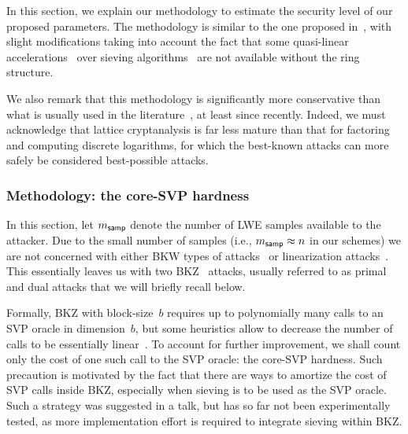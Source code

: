 \documentclass{iacrcc}
\begin{document}
In this section, we explain our methodology to estimate the security
level of our proposed parameters. The methodology is similar to the
one proposed in~\cite{USENIX:ADPS16}, with slight modifications taking
into account the fact that some quasi-linear
accelerations~\cite{AFRICACRYPT:Schneider13,BNP_IJAC16} over sieving
algorithms~\cite{SODA:BDGL16,LaarhovenThesis} are not available
without the ring structure.

We also remark that this methodology is significantly more
conservative than what is usually used in the
literature~\cite{albrecht15:_concrete_lwe}, at least since
recently. Indeed, we must acknowledge that lattice cryptanalysis is
far less mature than that for factoring and computing discrete
logarithms, for which the best-known attacks can more safely be
considered best-possible attacks.

\subsubsection{Methodology: the core-SVP hardness}
\label{subsec:coreSVPharness}

In this section, let $m_{\mathsf{samp}}$ denote the number of LWE samples
available to the attacker. Due to the small number of samples (i.e., $m_{\mathsf{samp}} \approx n$
in our schemes) we are not concerned with either BKW types of
attacks~\cite{C:KirFou15} or linearization attacks~\cite{ICALP:AroGe11}. This essentially leaves us with two BKZ~\cite{AC:CheNgu11} attacks, usually referred to as primal and dual attacks that we will briefly recall below.

Formally, BKZ with block-size~$b$ requires up to polynomially many
calls to an SVP oracle in dimension~$b$, but some heuristics allow to
decrease the number of calls to be essentially
linear~\cite{ChenThesis}. To account for further improvement, we shall
count only the cost of one such call to the SVP oracle: the core-SVP
hardness. Such precaution is motivated by the fact that there are ways
to amortize the cost of SVP calls inside BKZ, especially when sieving
is to be used as the SVP oracle. Such a strategy was suggested in a
talk, but has so far not been experimentally tested, as more
implementation effort is required to integrate sieving within BKZ.
\end{document}
